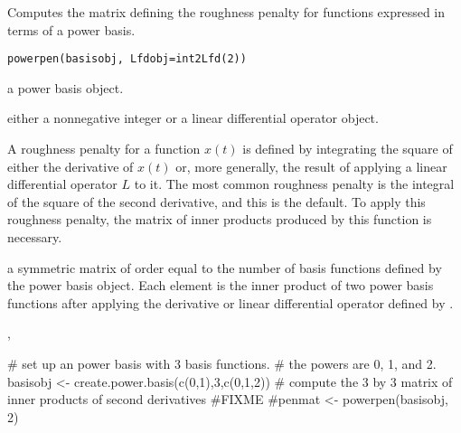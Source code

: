 \documentclass{article}
\begin{document}
\begin{Description}\relax
Computes the matrix defining the roughness penalty for functions
expressed in terms of a power basis.
\end{Description}
\begin{Usage}
\begin{verbatim}
powerpen(basisobj, Lfdobj=int2Lfd(2))
\end{verbatim}
\end{Usage}
\begin{Arguments}
\begin{ldescription}
\item[\code{basisobj}] a power basis object.

\item[\code{Lfdobj}] either a nonnegative integer or a linear differential operator object.

\end{ldescription}
\end{Arguments}
\begin{Details}\relax
A roughness penalty for a function $ x(t) $ is defined by
integrating the square of either the derivative of  $ x(t) $ or,
more generally, the result of applying a linear differential operator
$ L $ to it.  The most common roughness penalty is the integral of
the square of the second derivative, and
this is the default. To apply this roughness penalty, the matrix of
inner products produced by this function is necessary.
\end{Details}
\begin{Value}
a symmetric matrix of order equal to the number of basis functions
defined by the power basis object.  Each element is the inner product
of two power basis functions after applying the derivative or linear
differential operator defined by .
\end{Value}
\begin{SeeAlso}\relax
{}, 
\end{SeeAlso}
\begin{Examples}
\begin{ExampleCode}

#  set up an power basis with 3 basis functions.
#  the powers are 0, 1, and 2.
basisobj <- create.power.basis(c(0,1),3,c(0,1,2))
#  compute the 3 by 3 matrix of inner products of second derivatives
#FIXME
#penmat <- powerpen(basisobj, 2)

\end{ExampleCode}
\end{Examples}
\end{document}
